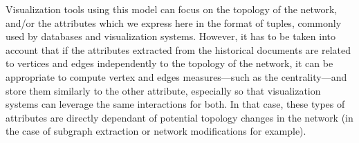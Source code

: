 Visualization tools using this model can focus on the topology of the network, and/or the attributes which we express here in the format of tuples, commonly used by databases and visualization systems\cite{stoltePolarisSystemQuery2002}.
However, it has to be taken into account that if the attributes extracted from the historical documents are related to vertices and edges independently to the topology of the network, it can be appropriate to compute vertex and edges measures---such as the centrality---and store them similarly to the other attribute, especially so that visualization systems can leverage the same interactions for both.
In that case, these types of attributes are directly dependant of potential topology changes in the network (in the case of subgraph extraction or network modifications for example).









